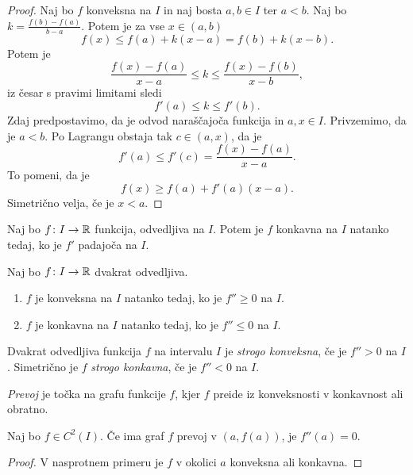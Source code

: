 \documentclass[12pt, a4paper]{article}
\begin{document}
\begin{proof}
Naj bo $f$ konveksna na $I$ in naj bosta $a,b\in I$ ter $a<b$. Naj bo $k=\frac{f(b)-f(a)}{b-a}$. Potem je za vse $x\in(a,b)$
\[
f(x)\leq f(a)+k(x-a)=f(b)+k(x-b).
\]
Potem je
\[
\frac{f(x)-f(a)}{x-a}\leq k\leq\frac{f(x)-f(b)}{x-b},
\]
iz česar s pravimi limitami sledi
\[
f'(a)\leq k\leq f'(b).
\]
Zdaj predpostavimo, da je odvod naraščajoča funkcija in $a,x\in I$. Privzemimo, da je $a<b$. Po Lagrangu obstaja tak $c\in(a,x)$, da je
\[
f'(a)\leq f'(c)=\frac{f(x)-f(a)}{x-a}.
\]
To pomeni, da je
\[
f(x)\geq f(a)+f'(a)(x-a).
\]
Simetrično velja, če je $x<a$.
\end{proof}

\begin{posledica}
Naj bo $f\colon I\to\mathbb{R}$ funkcija, odvedljiva na $I$. Potem je $f$ konkavna na $I$ natanko tedaj, ko je $f'$ padajoča na $I$.
\end{posledica}

\begin{posledica}
Naj bo $f\colon I\to\mathbb{R}$ dvakrat odvedljiva.

\begin{enumerate}[label=\roman*)]
\item $f$ je konveksna na $I$ natanko tedaj, ko je $f''\geq 0$ na $I$.
\item $f$ je konkavna na $I$ natanko tedaj, ko je $f''\leq 0$ na $I$.
\end{enumerate}
\end{posledica}

\begin{definicija}
Dvakrat odvedljiva funkcija $f$ na intervalu $I$ je \emph{strogo konveksna}, če je $f''>0$ na $I$. Simetrično je $f$ \emph{strogo konkavna}, če je $f''<0$ na $I$.
\end{definicija}

\begin{definicija}
\emph{Prevoj} je točka na grafu funkcije $f$, kjer $f$ preide iz konveksnosti v konkavnost ali obratno.
\end{definicija}

\begin{posledica}
Naj bo $f\in C^2(I)$. Če ima graf $f$ prevoj v $(a,f(a))$, je $f''(a)=0$.
\end{posledica}

\begin{proof}
V nasprotnem primeru je $f$ v okolici $a$ konveksna ali konkavna.
\end{proof}
\end{document}
